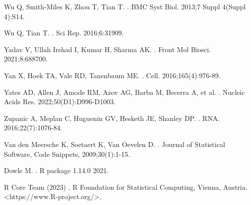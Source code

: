 \documentclass[10pt,letterpaper]{article}
\begin{document}
\begin{thebibliography}{10}
Wu Q, Smith-Miles K, Zhou T, Tian T.
.
\newblock BMC Syst Biol. 2013;7 Suppl 4(Suppl 4):S14.

Wu Q, Tian T.
.
\newblock Sci Rep. 2016;6:31909.

Yadav V, Ullah Irshad I, Kumar H, Sharma AK.
.
\newblock Front Mol Biosci. 2021;8:688700.

Yan X, Hoek TA, Vale RD, Tanenbaum ME.
.
\newblock Cell. 2016;165(4):976-89.

Yates AD, Allen J, Amode RM, Azov AG, Barba M, Becerra A, et al.
.
\newblock Nucleic Acids Res. 2022;50(D1):D996-D1003.

Zupanic A, Meplan C, Huguenin GV, Hesketh JE, Shanley DP.
.
\newblock RNA. 2016;22(7):1076-84.

Van den Meersche K, Soetaert K, Van Oevelen D.
.
\newblock Journal of Statistical Software, Code Snippets, 2009;30(1):1-15.
  
Dowle M.
.
\newblock R package 1.14.0 2021.

R Core Team (2023)
.
\newblock R Foundation for Statistical Computing, Vienna, Austria. <https://www.R-project.org/>.

\end{thebibliography}
\end{document}
